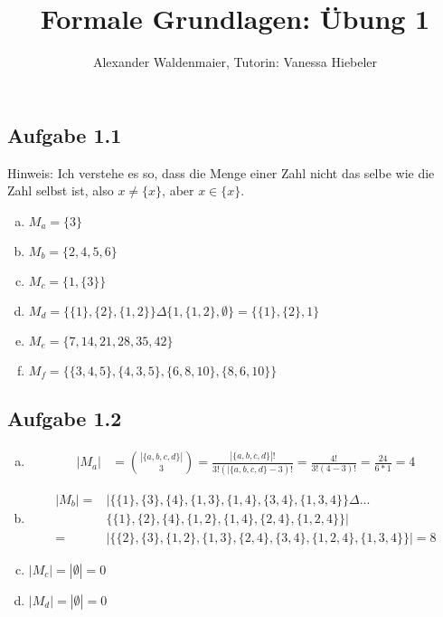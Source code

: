 \documentclass{article}
\title{Formale Grundlagen: Übung 1}
\author{Alexander Waldenmaier, Tutorin: Vanessa Hiebeler}
\begin{document}
    \maketitle
    \subsection*{Aufgabe 1.1}
    Hinweis: Ich verstehe es so, dass die Menge einer Zahl nicht das selbe wie die Zahl selbst ist, also
    $x \neq \{x\}$, aber $x \in \{x\}$.
    \begin{enumerate}[(a)]
        \item $M_a = \{3\}$
        \item $M_b = \{2,4,5,6\}$
        \item $M_c = \{1, \{3\}\}$
        \item $M_d = \{\{1\}, \{2\}, \{1, 2\}\}\Delta\{1, \{1, 2\}, \emptyset\} = \{\{1\}, \{2\}, 1\}$
        \item $M_e = \{7, 14, 21, 28, 35, 42\}$
        \item $M_f = \{\{3, 4, 5\}, \{4, 3, 5\}, \{6, 8, 10\}, \{8, 6, 10\} \}$
    \end{enumerate}


    \subsection*{Aufgabe 1.2}
    \begin{enumerate}[(a)]
        \item 
        \begin{align*}
            |M_a| &= \binom{|\{a, b, c, d\}|}{3} = \frac{|\{a, b, c, d\}|!}{3!(|\{a, b, c, d\}-3)!} = \frac{4!}{3!(4-3)!} = \frac{24}{6*1}=4
        \end{align*}
        \item 
        \begin{align*}
            |M_b| =& |\{\{1\}, \{3\}, \{4\}, \{1,3\}, \{1,4\}, \{3,4\}, \{1,3,4\}\}\Delta ... \\
            &\{\{1\}, \{2\}, \{4\}, \{1,2\}, \{1,4\}, \{2,4\}, \{1,2,4\}\}| \\
            =& |\{\{2\}, \{3\}, \{1, 2\}, \{1,3\}, \{2,4\}, \{3,4\}, \{1,2,4\}, \{1,3,4\}\}| = 8
        \end{align*}
        \item $|M_c| = |\emptyset| = 0$
        \item $|M_d| = |\emptyset| = 0$
    \end{enumerate}
\end{document}
